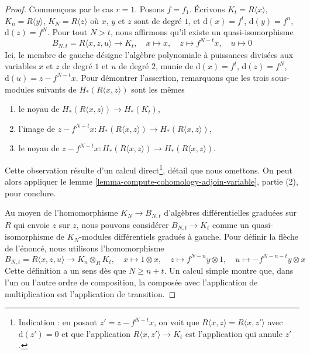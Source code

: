 \begin{proof}

Commençons par le cas $r = 1$. Posons $f = f_1$. Écrivons $K_t = R\langle x \rangle$,
$K_n = R\langle y \rangle$, $K_N = R\langle z \rangle$
où $x$, $y$ et $z$ sont de degré $1$, et
$\text{d}(x) = f^t$, $\text{d}(y) = f^n$,
$\text{d}(z) = f^N$. Pour tout $N > t$, nous affirmons qu'il existe un quasi-isomorphisme
$$
B_{N, t} = R\langle x, z, u \rangle
\longrightarrow
K_t,\quad
x \mapsto x,\quad
z \mapsto f^{N - t}x,\quad
u \mapsto 0
$$
Ici, le membre de gauche désigne l'algèbre polynomiale à puissances divisées aux variables $x$ et $z$ de degré $1$ et $u$ de degré $2$, munie de
$\text{d}(x) = f^t$, $\text{d}(z) = f^N$,
$\text{d}(u) = z - f^{N - t}x$. Pour démontrer l'assertion, remarquons que les trois sous-modules suivants de
$H_*(R\langle x, z\rangle)$ sont les mêmes

\begin{enumerate}

\item le noyau de $H_*(R\langle x, z\rangle) \to H_*(K_t)$,
\item l'image de
$z - f^{N - t}x : H_*(R\langle x, z\rangle) \to H_*(R\langle x, z\rangle)$,
\item le noyau de
$z - f^{N - t}x : H_*(R\langle x, z\rangle) \to H_*(R\langle x, z\rangle)$.

\end{enumerate}

Cette observation résulte d'un calcul direct\footnote{Indication : en posant
$z' = z - f^{N - t}x$, on voit que
$R\langle x, z\rangle = R\langle x, z'\rangle$ avec $\text{d}(z') = 0$
et que l'application $R\langle x, z'\rangle \to K_t$ est l'application qui annule $z'$.}, détail que nous omettons. On peut alors appliquer le lemme \ref{lemma-compute-cohomology-adjoin-variable}, partie (2), pour conclure.

\medskip\noindent
Au moyen de l'homomorphisme $K_N \to B_{N, t}$ d'algèbres différentielles graduées sur $R$ qui envoie $z$ sur $z$, nous pouvons considérer $B_{N, t} \to K_t$ comme un quasi-isomorphisme de $K_N$-modules différentiels gradués à gauche. Pour définir la flèche de l'énoncé, nous utilisons l'homomorphisme
$$
B_{N, t} = R\langle x, z, u \rangle \to K_n \otimes_R K_t,\quad
x \mapsto 1 \otimes x,\quad
z \mapsto f^{N - n}y \otimes 1,\quad
u \mapsto - f^{N - n - t}y \otimes x
$$
Cette définition a un sens dès que $N \geq n + t$. Un calcul simple montre que, dans l'un ou l'autre ordre de composition, la composée avec l'application de multiplication est l'application de transition.


\end{proof}
